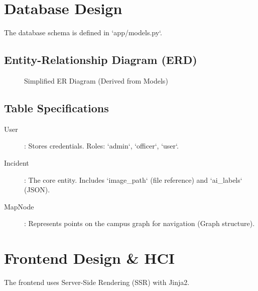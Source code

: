 \documentclass[12pt,a4paper]{article}
\begin{document}
\section{Database Design}
The database schema is defined in `app/models.py`.

\subsection{Entity-Relationship Diagram (ERD)}
\begin{figure}[h]
    \centering
    \caption{Simplified ER Diagram (Derived from Models)}
    \label{fig:erd}
\end{figure}

\subsection{Table Specifications}
\begin{description}
    \item[User]: Stores credentials. Roles: `admin`, `officer`, `user`.
    \item[Incident]: The core entity. Includes `image_path` (file reference) and `ai_labels` (JSON).
    \item[MapNode]: Represents points on the campus graph for navigation (Graph structure).
\end{description}

\section{Frontend Design \& HCI}
The frontend uses Server-Side Rendering (SSR) with Jinja2.
\end{document}
